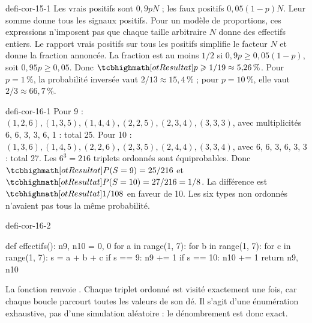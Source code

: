 \begin{blocEdition}{defi-cor-15-1}
Les vrais positifs sont $0{,}9pN$ ; les faux positifs $0{,}05(1-p)N$. Leur somme donne tous les signaux positifs. Pour un modèle de proportions, ces expressions n’imposent pas que chaque taille arbitraire $N$ donne des effectifs entiers.
Le rapport vrais positifs sur tous les positifs simplifie le facteur $N$ et donne la fraction annoncée.
La fraction est au moins $1/2$ si $0{,}9p\ge0{,}05(1-p)$, soit $0{,}95p\ge0{,}05$. Donc $\res{p\ge1/19\approx5{,}26\,\%}$. Pour $p=1\,\%$, la probabilité inversée vaut $2/13\approx15{,}4\,\%$ ; pour $p=10\,\%$, elle vaut $2/3\approx66{,}7\,\%$.
\label{fig-defi-cor-15}

\end{blocEdition}
\begin{blocEdition}{defi-cor-16-1}
Pour 9 : $(1,2,6),(1,3,5),(1,4,4),(2,2,5),(2,3,4),(3,3,3)$, avec multiplicités 6, 6, 3, 3, 6, 1 : total 25. Pour 10 : $(1,3,6),(1,4,5),(2,2,6),(2,3,5),(2,4,4),(3,3,4)$, avec 6, 6, 3, 6, 3, 3 : total 27.
Les $6^3=216$ triplets ordonnés sont équiprobables. Donc $\res{P(S=9)=25/216}$ et $\res{P(S=10)=27/216=1/8}$. La différence est $\res{1/108}$ en faveur de 10. Les six types non ordonnés n’avaient pas tous la même probabilité.
\end{blocEdition}
\begin{blocEdition}{defi-cor-16-2}
\begin{python}
def effectifs():
    n9, n10 = 0, 0
    for a in range(1, 7):
        for b in range(1, 7):
            for c in range(1, 7):
                s = a + b + c
                if s == 9:
                    n9 += 1
                if s == 10:
                    n10 += 1
    return n9, n10
\end{python}
La fonction renvoie . Chaque triplet ordonné est visité exactement une fois, car chaque boucle parcourt toutes les valeurs de son dé. Il s’agit d’une énumération exhaustive, pas d’une simulation aléatoire : le dénombrement est donc exact.
\end{blocEdition}
